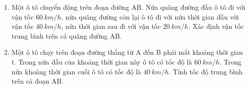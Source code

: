 \begin{enumerate}[label=\bfseries Câu \arabic*:]
{	}
	\item {}
	
	{
		
		Một ô tô chuyển động trên đoạn đường AB. Nửa quãng đường đầu ô tô đi với vận tốc $\SI{60}{km/h}$, nửa quãng đường còn lại ô tô đi với nửa thời gian đầu với vận tốc $\SI{40}{km/h}$, nửa thời gian sau đi với vận tốc $\SI{20}{km/h}$. Xác định vận tốc trung bình trên cả quãng đường AB.
	}
		\item {}
	
	{
		
		Một ô tô chạy trên đoạn đường thẳng từ A đến B phải mất khoảng thời gian $t$. Trong nửa đầu của khoảng thời gian này ô tô có tốc độ là $\SI{60}{km/h}$. Trong nửa khoảng thời gian cuối ô tô có tốc độ là $\SI{40}{km/h}$. Tính tốc độ trung bình trên cả đoạn AB.
	}
\end{enumerate}
